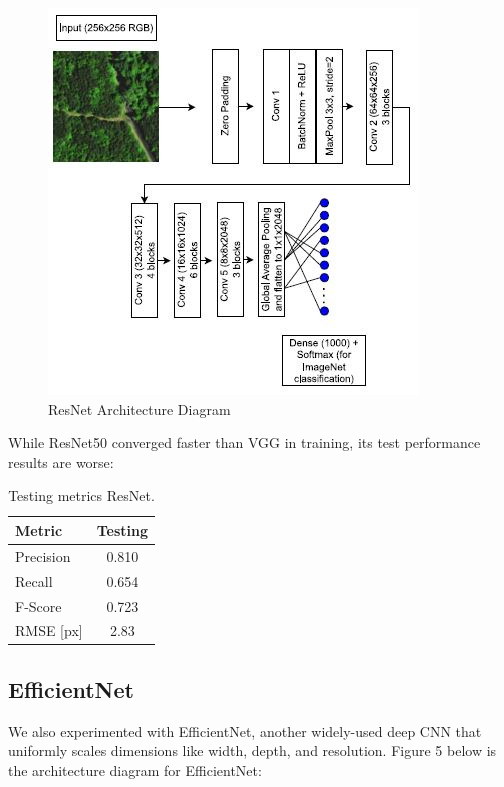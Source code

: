 \documentclass[conference]{ieeetran}
\begin{document}
\begin{figure}[htbp]
  \centering
  \includegraphics[width=0.9\linewidth]{ResNet.JPG}
  \caption{ResNet Architecture Diagram}
  \label{fig:my_label}
\end{figure}
\FloatBarrier

While ResNet50 converged faster than VGG in training, its test performance results are worse: 


\begin{table}[htbp]
  \centering
  \begin{tabular}{lc}
    \hline
    \textbf{Metric} & \textbf{Testing} \\
    \hline
    Precision & 0.810 \\
    Recall    & 0.654 \\
    F-Score   & 0.723 \\
    RMSE [px] & 2.83 \\
    \hline
  \end{tabular}
  \caption{Testing metrics ResNet.}
  \label{tab:testing_metrics}
\end{table}



\subsection{EfficientNet}

We also experimented with EfficientNet, another widely-used deep CNN that uniformly scales dimensions like width, depth, and resolution. Figure 5 below is the architecture diagram for EfficientNet:
\end{document}
